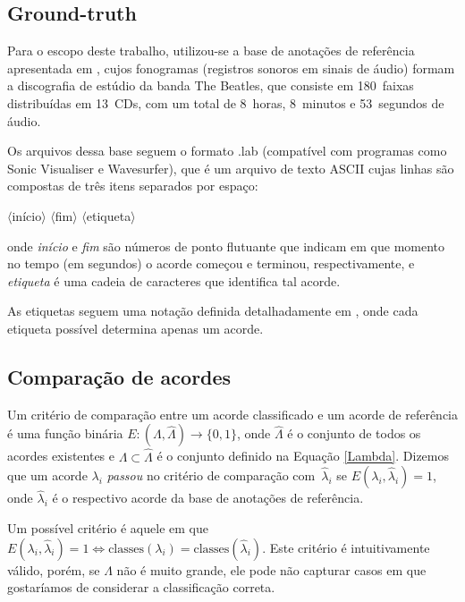     \subsection{Ground-truth}
        Para o escopo deste trabalho, utilizou-se a base de anotações de referência apresentada em \cite{harte}, cujos fonogramas (registros sonoros em sinais de áudio) formam a discografia de estúdio da banda The Beatles, que consiste em 180~faixas distribuídas em 13~CDs, com um total de 8~horas, 8~minutos e 53~segundos de áudio.
        
        Os arquivos dessa base seguem o formato .lab (compatível com programas como Sonic Visualiser e Wavesurfer), que é um arquivo de texto ASCII cujas linhas são compostas de três itens separados por espaço:
        
        \begin{center}
            $\langle$início$\rangle$
            $\langle$fim$\rangle$
            $\langle$etiqueta$\rangle$
        \end{center}
        
       \noindent onde \textit{início} e \textit{fim} são números de ponto flutuante que indicam em que momento no tempo (em segundos) o acorde começou e terminou, respectivamente, e \textit{etiqueta} é uma cadeia de caracteres que identifica tal acorde.
        
        As etiquetas seguem uma notação definida detalhadamente em \cite{harte}, onde cada etiqueta possível determina apenas um acorde.


    \subsection{Comparação de acordes}
        Um critério de comparação entre um acorde classificado e um acorde de referência é uma função binária $E: (\Lambda, \hat{\Lambda}) \rightarrow \{0, 1\}$, onde $\hat{\Lambda}$ é o conjunto de todos os acordes existentes e $\Lambda \subset \hat{\Lambda}$ é o conjunto definido na Equação \ref{Lambda}. Dizemos que um acorde $\lambda_i$ \textit{passou} no critério de comparação com~$\hat{\lambda}_i$ se $E(\lambda_i, \hat{\lambda}_i) = 1$, onde $\hat{\lambda}_i$ é o respectivo acorde da base de anotações de referência.
        
        Um possível critério é aquele em que $E(\lambda_i, \hat{\lambda}_i) = 1 \Leftrightarrow \mbox{classes}(\lambda_i) = \mbox{classes}(\hat{\lambda}_i)$. Este critério é intuitivamente válido, porém, se $\Lambda$ não é muito grande, ele pode não capturar casos em que gostaríamos de considerar a classificação correta.
        
